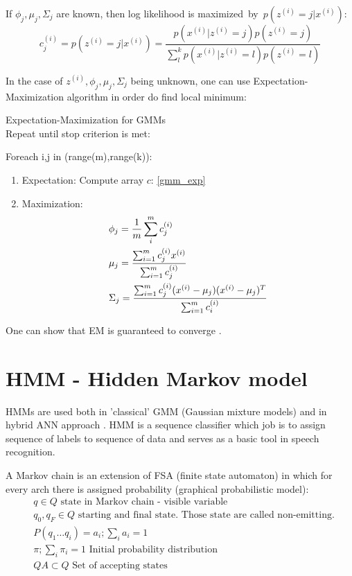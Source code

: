 If $\phi_j, \mu_j, \Sigma_j$ are known, then log likelihood is maximized~by~$p(z^{(i)}=j|x^{(i)})$:
\begin{equation}
	\label{gmm_exp}
	c_{j}^{(i)}=p(z^{(i)}=j|x^{(i)}) = \frac{p(x^{(i)}|z^{(i)}=j)p(z^{(i)}=j)}{\sum\limits^k_l p(x^{(i)}|z^{(i)}=l)p(z^{(i)}=l)}
\end{equation}

In the case of $z^{(i)}, \phi_j, \mu_j, \Sigma_j$ being unknown, one can use Expectation-Maximization algorithm in order do find local minimum: 

\begin{algorithm} Expectation-Maximization for GMMs \\
Repeat until stop criterion is met:
\begin{indenva}
Foreach i,j in (range(m),range(k)):
\begin{indenvb}
	\begin{enumerate}
\item Expectation: 
	Compute array $c$: \eqref{gmm_exp}  
\item Maximization: 
	\begin{align}
		& \phi_j = \frac{1}{m}\operatorname*{\sum}_i^m c^{(i)}_j  \\
		& \mu_j = \frac{\operatorname*{\sum}^m_{i=1}c^{(i)}_jx^{(i)}}{\operatorname*{\sum}^m_{i=1}c^{(i)}_j} \\
		& \Sigma_j = \frac{\sum_{i=1}^m c^{(i)}_j(x^{(i)}-\mu_j)(x^{(i)}-\mu_j)^T}{\sum_{i=1}^m c^{(i)}_i}
	\end{align}
	\end{enumerate}
\end{indenvb}
\end{indenva}
\end{algorithm}
One can show that EM is guaranteed to converge \parencite{ng_cs229_2000}.


\section{HMM - Hidden Markov model}

HMMs are used both in 'classical' GMM (Gaussian mixture models) and in hybrid ANN approach \parencite{jurafsky}. HMM is a sequence classifier which job is to assign sequence of labels to sequence of data and serves as a basic tool in speech recognition.

\begin{definition} A Markov chain is an extension of FSA (finite state automaton) in which for every arch there is assigned probability (graphical probabilistic model):
	\begin{align}
		& q \in Q \text{ state in Markov chain - visible variable} \\
		& q_0,q_F \in Q \text{ starting and final state. Those state are called non-emitting.} \\
		& P(q_1 \ldots q_{i})=a_i; \sum\limits_{i}a_i=1\\
		& \pi; \sum\limits_{i} \pi_i=1 \text{ Initial probability distribution} \\
		& QA \subset Q \text{ Set of accepting states } 
	\end{align}
\end{definition}

